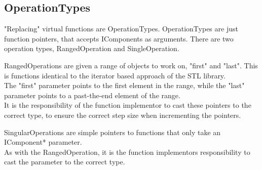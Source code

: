 \subsection{OperationTypes}

"Replacing" virtual functions are OperationTypes.
OperationTypes are just function pointers, that accepts IComponents as arguments.
There are two operation types, RangedOperation and SingleOperation.

RangedOperations are given a range of objects to work on, "first" and "last".
This is functions identical to the iterator based approach of the STL library.\\
The "first" parameter points to the first element in the range, while the "last" parameter points to a past-the-end element of the range.\\
It is the responsibility of the function implementor to cast these pointers to the correct type, 
to ensure the correct step size when incrementing the pointers.

SingularOperations are simple pointers to functions that only take an IComponent* parameter.\\
As with the RangedOperation, it is the function implementors responsibility to cast the parameter to the correct type.
